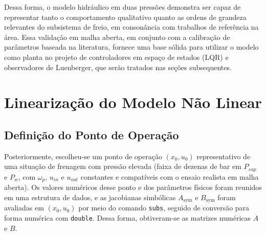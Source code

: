 Dessa forma, o modelo hidráulico em duas pressões demonstra ser capaz de representar tanto o comportamento qualitativo quanto as ordens de grandeza relevantes do subsistema de freio, em consonância com trabalhos de referência na área. Essa validação em malha aberta, em conjunto com a calibração de parâmetros baseada na literatura, fornece uma base sólida para utilizar o modelo como planta no projeto de controladores em espaço de estados (LQR) e observadores de Luenberger, que serão tratados nas seções subsequentes.


\section{Linearização do Modelo Não Linear}
\label{sec:controle-linearizacao-2p}

\subsection{Definição do Ponto de Operação}
\label{sec:definicao-ponto-operacao}

Posteriormente, escolheu-se um ponto de operação $(x_0,u_0)$ representativo de uma situação de frenagem com pressão elevada (faixa de dezenas de bar em $P_{sup}$ e $P_w$, com $\omega_p$, $u_{in}$ e $u_{out}$ constantes e compatíveis com o ensaio realista em malha aberta). Os valores numéricos desse ponto e dos parâmetros físicos foram reunidos em uma estrutura de dados, e as jacobianas simbólicas $A_{\text{sym}}$ e $B_{\text{sym}}$ foram avaliadas em $(x_0,u_0)$ por meio do comando \texttt{subs}, seguido de conversão para forma numérica com \texttt{double}. Dessa forma, obtiveram-se as matrizes numéricas $A$ e $B$.

